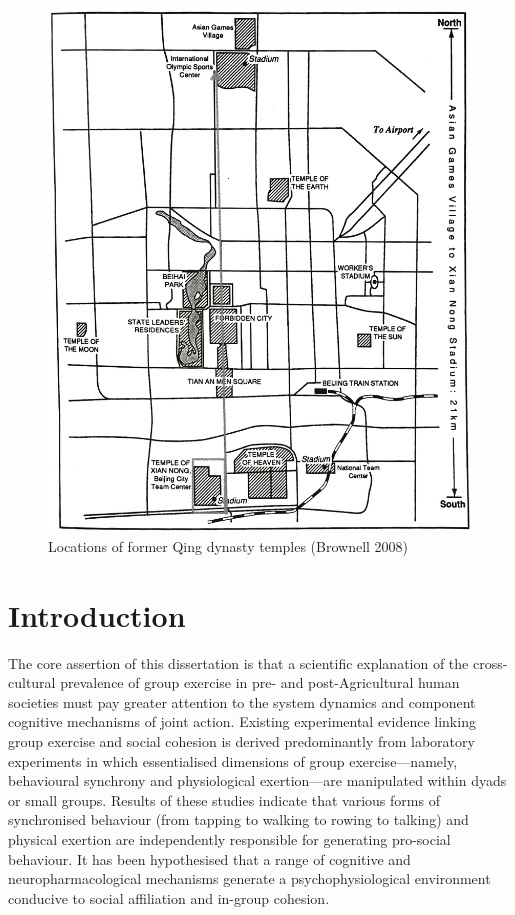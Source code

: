 \begin{figure}[htbp]
  \includegraphics[width = \linewidth]{images/beijingTemplesXNT.png}
  \caption{Locations of former Qing dynasty temples (Brownell 2008)}
  \label{fig:beijingTemplesXNT}
\end{figure}


\section{Introduction}

The core assertion of this dissertation is that a scientific explanation of the cross-cultural prevalence of group exercise in pre- and post-Agricultural human societies must pay greater attention to the system dynamics and component cognitive mechanisms of joint action. Existing experimental evidence linking group exercise and social cohesion is derived predominantly from laboratory experiments in which essentialised dimensions of group exercise---namely, behavioural synchrony and physiological exertion---are manipulated within dyads or small groups.  Results of these studies indicate that various forms of synchronised behaviour (from tapping to walking to rowing to talking) and physical exertion are independently responsible for generating pro-social behaviour. It has been hypothesised that a range of cognitive and neuropharmacological mechanisms generate a psychophysiological environment conducive to social affiliation and in-group cohesion.

